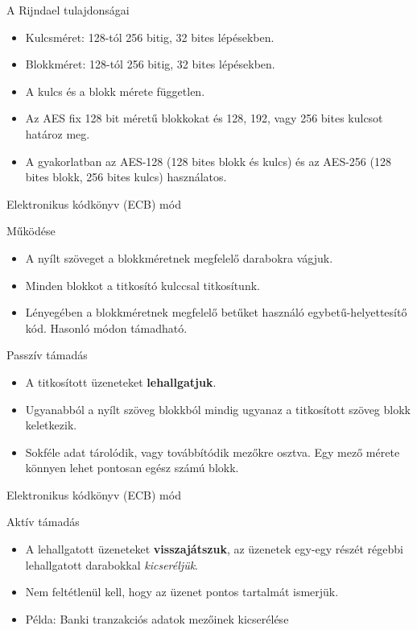 \documentclass[12 pt]{beamer}
\begin{document}
\begin{frame}{A Rijndael tulajdonságai}
  \begin{itemize}
    \item{Kulcsméret: 128-tól 256 bitig, 32 bites lépésekben.}
    \item{Blokkméret: 128-tól 256 bitig, 32 bites lépésekben.}
    \item{A kulcs és a blokk mérete független.}
    \item{Az AES fix 128 bit méretű blokkokat és 128, 192, vagy 256 bites kulcsot határoz meg.}
    \item{A gyakorlatban az AES-128 (128 bites blokk és kulcs) és az AES-256 (128 bites blokk, 256 bites kulcs) használatos.}
  \end{itemize}
\end{frame}



\begin{frame}{Elektronikus kódkönyv (ECB) mód}
    \begin{block}{Működése}
      \begin{itemize}
        \item{A nyílt szöveget a blokkméretnek megfelelő darabokra vágjuk.}
        \item{Minden blokkot a titkosító kulccsal titkosítunk.}
        \item{Lényegében a blokkméretnek megfelelő betűket használó egybetű-helyettesítő kód. Hasonló módon támadható.}
      \end{itemize}
    \end{block}
    
    \begin{block}{Passzív támadás}
      \begin{itemize}
        \item{A titkosított üzeneteket \textbf{lehallgatjuk}.}
        \item{Ugyanabból a nyílt szöveg blokkból mindig ugyanaz a titkosított szöveg blokk keletkezik.}
        \item{Sokféle adat tárolódik, vagy továbbítódik mezőkre osztva. Egy mező mérete könnyen lehet pontosan egész számú blokk.}
      \end{itemize}
    \end{block}

\end{frame}

\begin{frame}{Elektronikus kódkönyv (ECB) mód}
    \begin{block}{Aktív támadás}
      \begin{itemize}
        \item{A lehallgatott üzeneteket \textbf{visszajátszuk}, az üzenetek egy-egy részét régebbi lehallgatott darabokkal \emph{kicseréljük}.}
        \item{Nem feltétlenül kell, hogy az üzenet pontos tartalmát ismerjük.}
        \item{Példa: Banki tranzakciós adatok mezőinek kicserélése}
      \end{itemize}
    \end{block}
\end{frame}
\end{document}
